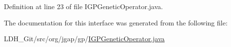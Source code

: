 Definition at line 23 of file I\-G\-P\-Genetic\-Operator.\-java.



The documentation for this interface was generated from the following file\-:\begin{DoxyCompactItemize}
\item 
L\-D\-H\-\_\-\-Git/src/org/jgap/gp/\hyperlink{_i_g_p_genetic_operator_8java}{I\-G\-P\-Genetic\-Operator.\-java}\end{DoxyCompactItemize}
